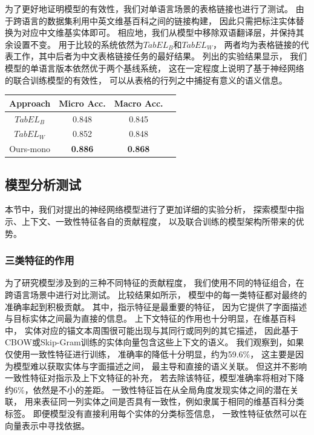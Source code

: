 为了更好地证明模型的有效性，我们对单语言场景的表格链接也进行了测试。
由于跨语言的数据集利用中英文维基百科之间的链接构建，
因此只需把标注实体替换为对应中文维基实体即可。
相应地，我们从模型中移除双语翻译层，并保持其余设置不变。
用于比较的系统依然为$TabEL_B$和$TabEL_W$，
两者均为表格链接的代表工作，其中后者为中文表格链接任务的最好结果。
列出的实验结果显示，
我们模型的单语言版本依然优于两个基线系统，
这在一定程度上说明了基于神经网络的联合训练模型的有效性，
可以从表格的行列之中捕捉有意义的语义信息。

\begin{table}[ht]
	\centering
	\label{tab:tabel-mono-result}
	\begin{tabular} {c|c|cc}
        \hline
		Approach          & Micro Acc.   & Macro Acc.    \\
		\hline
		$TabEL_B$         &  0.848       & 0.845         \\
		$TabEL_W$         &  0.852       & 0.848         \\     
		Ours-mono  &  \textbf{0.886}       & \textbf{0.868}   \\
        \hline
	\end{tabular}
\end{table}





\subsection{模型分析测试}
\label{sec:tabel-ablation}

本节中，我们对提出的神经网络模型进行了更加详细的实验分析，
探索模型中指示、上下文、一致性特征各自的贡献程度，
以及联合训练的模型架构所带来的优势。

\subsubsection{三类特征的作用}

为了研究模型涉及到的三种不同特征的贡献程度，
我们使用不同的特征组合，在跨语言场景中进行对比测试。
比较结果如所示，
模型中的每一类特征都对最终的准确率起到积极贡献。
其中，指示特征是最重要的特征，
因为它提供了字面描述与目标实体之间最为直接的信息。
上下文特征的作用也十分明显，在维基百科中，
实体对应的锚文本周围很可能出现与其同行或同列的其它描述，
因此基于CBOW或Skip-Gram训练的实体向量包含这些上下文的语义。
我们观察到，如果仅使用一致性特征进行训练，
准确率的降低十分明显，约为59.6\%，
这主要是因为模型难以获取实体与字面描述之间，
最主导和直接的语义关联。
但这并不影响一致性特征对指示及上下文特征的补充，
若去除该特征，模型准确率将相对下降约6\%，依然是不小的差距。
一致性特征旨在从全局角度发现实体之间的潜在关联，
用来表征同一列实体之间是否具有一致性，例如隶属于相同的维基百科分类标签。
即便模型没有直接利用每个实体的分类标签信息，
一致性特征依然可以在向量表示中寻找依据。

